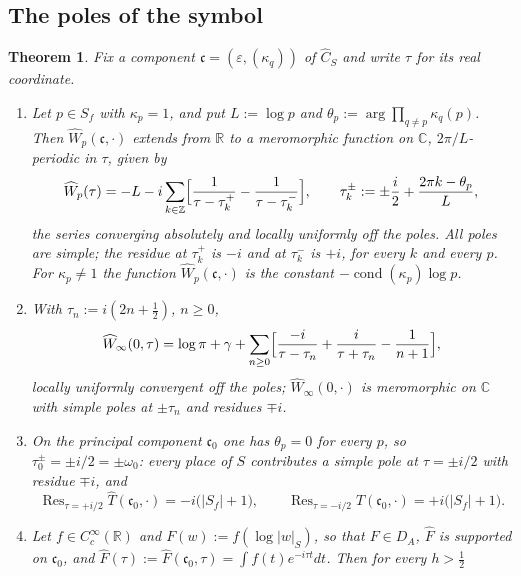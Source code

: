 \documentclass[11pt]{amsart}
\newtheorem{theorem}{Theorem}[section]
\theoremstyle{definition}
\theoremstyle{remark}
\newcommand{\C}{\mathbb C}
\newcommand{\R}{\mathbb R}
\newcommand{\Z}{\mathbb Z}
\newcommand{\Res}{\operatorname{Res}}
\newcommand{\Th}{\widehat{T}}
\newcommand{\Wh}{\widehat{W}}
\newcommand{\Ch}{\widehat{C}_S}
\newcommand{\DA}{D_A}
\newcommand{\cond}{\operatorname{cond}}
\begin{document}
\subsection{The poles of the symbol}

\begin{theorem}\label{thm:ML}
Fix a component $\mathfrak c=(\varepsilon,(\kappa_q))$ of $\Ch$ and write
$\tau$ for its real coordinate.
\begin{enumerate}
\item[(a)] Let $p\in S_f$ with $\kappa_p=1$, and put $L:=\log p$ and
$\theta_p:=\arg\prod_{q\ne p}\kappa_q(p)$.  Then $\Wh_p(\mathfrak c,\cdot)$
extends from $\R$ to a meromorphic function on $\C$, $2\pi/L$-periodic in
$\tau$, given by
\begin{equation}\label{eq:MLp}
\Wh_p(\tau)=-L-i\sum_{k\in\Z}
\Bigl[\frac{1}{\tau-\tau_k^{+}}-\frac{1}{\tau-\tau_k^{-}}\Bigr],
\qquad \tau_k^{\pm}:=\pm\frac{i}{2}+\frac{2\pi k-\theta_p}{L},
\end{equation}
the series converging absolutely and locally uniformly off the poles.
All poles are simple; the residue at $\tau_k^{+}$ is $-i$ and at $\tau_k^{-}$
is $+i$, for every $k$ and every $p$.  For $\kappa_p\ne1$ the function
$\Wh_p(\mathfrak c,\cdot)$ is the constant $-\cond(\kappa_p)\log p$.
\item[(b)] With $\tau_n:=i(2n+\tfrac12)$, $n\ge0$,
\begin{equation}\label{eq:MLinf}
\Wh_{\infty}(0,\tau)=\log\pi+\gamma+\sum_{n\ge0}
\Bigl[\frac{-i}{\tau-\tau_n}+\frac{i}{\tau+\tau_n}-\frac{1}{n+1}\Bigr],
\end{equation}
locally uniformly convergent off the poles; $\Wh_{\infty}(0,\cdot)$ is
meromorphic on $\C$ with simple poles at $\pm\tau_n$ and residues $\mp i$.
\item[(c)] On the principal component $\mathfrak c_0$ one has $\theta_p=0$ for
every $p$, so $\tau_0^{\pm}=\pm i/2=\pm\omega_0$: every place of $S$
contributes a simple pole at $\tau=\pm i/2$ with residue $\mp i$, and
\begin{equation}\label{eq:residues}
\Res_{\tau=+i/2}\Th(\mathfrak c_0,\cdot)=-i\bigl(|S_f|+1\bigr),\qquad
\Res_{\tau=-i/2}\Th(\mathfrak c_0,\cdot)=+i\bigl(|S_f|+1\bigr).
\end{equation}
\item[(d)] Let $f\in C_c^{\infty}(\R)$ and $F(w):=f(\log|w|_S)$, so that
$F\in\DA$, $\widehat F$ is supported on $\mathfrak c_0$, and
$\widehat F(\tau):=\widehat F(\mathfrak c_0,\tau)=\int f(t)e^{-i\tau t}dt$.
Then for every $h>\tfrac12$

\end{enumerate}
\end{theorem}
\end{document}

